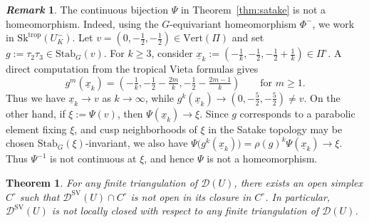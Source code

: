 \documentclass[reqno, 12pt]{amsart}
\newtheorem{thm}[prop]{Theorem}
\theoremstyle{definition}
\newtheorem{rem}[prop]{\it Remark}
\newcommand{\cD}{\mathcal{D}}
\newcommand{\trop}{\mathrm{trop}}
\newcommand{\SV}{\mathrm{SV}}
\newcommand{\Sk}{\mathrm{Sk}}
\newcommand{\ux}{\underline{x}}
\newcommand{\VPi}{\mathrm{Vert}(\Pi)}
\newcommand{\Stab}{\mathrm{Stab}}
\numberwithin{equation}{section}
\begin{document}
\begin{rem}
The continuous bijection $\Psi$ in Theorem~\ref{thm:satake} is
not a homeomorphism. Indeed, using the $G$-equivariant homeomorphism
$\Phi^-$, we work in $\Sk^{\trop}(U^-_K)$. Let $v=(0,-\tfrac12,-\tfrac12)\in\VPi$
and set $g:=\tau_2\tau_3\in\Stab_G(v)$. For $k\geq 3$, consider
$\ux_k:=(-\tfrac{1}{k},-\tfrac12,-\tfrac12+\tfrac{1}{k})\in\Pi^\circ$.
A direct computation from the tropical Vieta formulas gives
\[
g^m(\ux_k)
=
(-\tfrac{1}{k},-\tfrac12-\tfrac{2m}{k},
-\tfrac12-\tfrac{2m-1}{k})
\qquad \textrm{for }m\ge1.
\]
Thus we have $\ux_{k}\to v$ as $k\to\infty$, while
$g^k(\ux_{k})
\to
(0,-\tfrac52,-\tfrac52)\neq v$.
On the other hand, if $\xi:=\Psi(v)$, then
$\Psi(\ux_{k})\to\xi$. Since $g$ corresponds to a parabolic element
fixing $\xi$, and cusp neighborhoods of $\xi$ in the Satake topology
may be chosen $\Stab_G(\xi)$-invariant, we also have
$\Psi\bigl(g^k(\ux_{k})\bigr)
=
\rho(g)^k\Psi(\ux_{k})
\longrightarrow \xi$.
Thus $\Psi^{-1}$ is not continuous at $\xi$, and hence $\Psi$ is not a
homeomorphism. 
\end{rem}

\begin{thm}\label{thm:markov-not-locally-closed}
For any finite triangulation of $\cD(U)$, there exists an open simplex $C^\circ$ such that $
\cD^{\SV}(U)\cap C^\circ$
is not open in its closure in $C^\circ$. In particular,
$\cD^{\SV}(U)$ is not locally closed with respect to any finite triangulation
of $\cD(U)$.
\end{thm}
\end{document}

